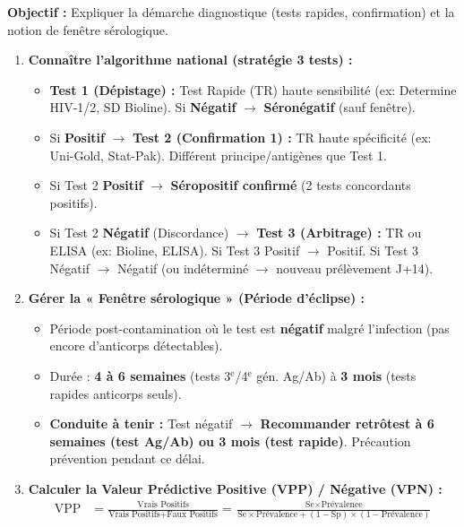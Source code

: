 \documentclass[11pt]{article}
\begin{document}
\begin{methode}
\textbf{Objectif :} Expliquer la démarche diagnostique (tests rapides, confirmation) et la notion de fenêtre sérologique.
\begin{enumerate}
    \item \textbf{Connaître l'algorithme national (stratégie 3 tests) :}
    \begin{itemize}
        \item \textbf{Test 1 (Dépistage) :} Test Rapide (TR) haute sensibilité (ex: Determine HIV-1/2, SD Bioline). Si \textbf{Négatif} $\rightarrow$ \textbf{Séronégatif} (sauf fenêtre).
        \item Si \textbf{Positif} $\rightarrow$ \textbf{Test 2 (Confirmation 1) :} TR haute spécificité (ex: Uni-Gold, Stat-Pak). Différent principe/antigènes que Test 1.
        \item Si Test 2 \textbf{Positif} $\rightarrow$ \textbf{Séropositif confirmé} (2 tests concordants positifs).
        \item Si Test 2 \textbf{Négatif} (Discordance) $\rightarrow$ \textbf{Test 3 (Arbitrage) :} TR ou ELISA (ex: Bioline, ELISA). Si Test 3 Positif $\rightarrow$ Positif. Si Test 3 Négatif $\rightarrow$ Négatif (ou indéterminé $\rightarrow$ nouveau prélèvement J+14).
    \end{itemize}
    \item \textbf{Gérer la « Fenêtre sérologique » (Période d'éclipse) :}
    \begin{itemize}
        \item Période post-contamination où le test est \textbf{négatif} malgré l'infection (pas encore d'anticorps détectables).
        \item Durée : \textbf{4 à 6 semaines} (tests 3$^{\text{e}}$/4$^{\text{e}}$ gén. Ag/Ab) à \textbf{3 mois} (tests rapides anticorps seuls).
        \item \textbf{Conduite à tenir :} Test négatif $\rightarrow$ \textbf{Recommander retrôtest à 6 semaines (test Ag/Ab) ou 3 mois (test rapide)}. Précaution prévention pendant ce délai.
    \end{itemize}
    \item \textbf{Calculer la Valeur Prédictive Positive (VPP) / Négative (VPN) :}
    \begin{align*}
        \text{VPP} &= \frac{\text{Vrais Positifs}}{\text{Vrais Positifs} + \text{Faux Positifs}} = \frac{\text{Se} \times \text{Prévalence}}{\text{Se} \times \text{Prévalence} + (1-\text{Sp}) \times (1-\text{Prévalence})} \\

\end{align*}
\end{enumerate}
\end{methode}
\end{document}
